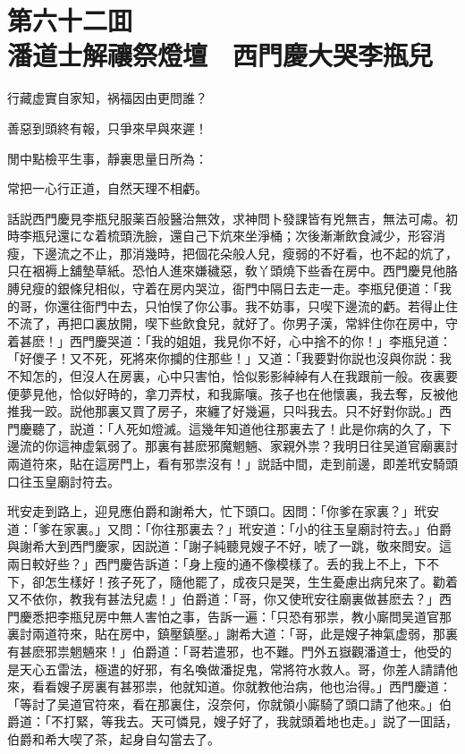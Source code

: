 
\chapter*{第六十二囬　\\潘道士解禳祭燈壇　西門慶大哭李瓶兒}
\thispagestyle{empty}

\begin{myquote}
行藏虚實自家知，祸福因由更問誰？

善惡到頭終有報，只爭來早與來遲！

閒中點檢平生事，靜裏思量日所為：

常把一心行正道，自然天理不相虧。
\end{myquote}

話説西門慶見李瓶兒服薬百般醫治無效，求神問卜發課皆有兇無吉，無法可䖏。初時李瓶兒還にな着梳頭洗臉，還自己下炕來坐淨桶；次後漸漸飲食減少，形容消瘦，下邊流之不止，那消幾時，把個花朵般人兒，瘦弱的不好看，也不起的炕了，只在裀褥上舖墊草紙。恐怕人進來嫌穢惡，敎丫頭燒下些香在房中。西門慶見他胳膊兒瘦的銀條兒相似，守着在房内哭泣，衙門中隔日去走一走。李瓶兒便道：「我的哥，你還往衙門中去，只怕悮了你公事。我不妨事，只喫下邊流的虧。若得止住不流了，再把口裏放開，喫下些飲食兒，就好了。你男子漢，常絆住你在房中，守着甚麽！」西門慶哭道：「我的姐姐，我見你不好，心中捨不的你！」李瓶兒道：「好儍子！又不死，死將來你攔的住那些！」又道：「我要對你説也沒與你説：我不知怎的，但沒人在房裏，心中只害怕，恰似影影綽綽有人在我跟前一般。夜裏要便夢見他，恰似好時的，拿刀弄杖，和我廝嚷。孩子也在他懷裏，我去奪，反被他推我一跤。説他那裏又買了房子，來纏了好幾遍，只呌我去。只不好對你説。」西門慶聽了，説道：「人死如燈滅。這幾年知道他往那裏去了！此是你病的久了，下邊流的你這神虚氣弱了。那裏有甚麽邪魔魍魎、家親外祟？我明日往吴道官廟裏討兩道符來，貼在這房門上，看有邪祟沒有！」説話中間，走到前邊，即差玳安騎頭口往玉皇廟討符去。

玳安走到路上，迎見應伯爵和謝希大，忙下頭口。因問：「你爹在家裏？」玳安道：「爹在家裏。」又問：「你往那裏去？」玳安道：「小的往玉皇廟討符去。」伯爵與謝希大到西門慶家，因説道：「謝子純聽見嫂子不好，唬了一跳，敬來問安。這兩日較好些？」西門慶告訴道：「身上瘦的通不像模樣了。丢的我上不上，下不下，卻怎生樣好！孩子死了，隨他罷了，成夜只是哭，生生憂慮出病兒來了。勸着又不依你，教我有甚法兒處！」伯爵道：「哥，你又使玳安往廟裏做甚麽去？」西門慶悉把李瓶兒房中無人害怕之事，告訴一遍：「只恐有邪祟，教小廝問吴道官那裏討兩道符來，貼在房中，鎮壓鎮壓。」謝希大道：「哥，此是嫂子神氣虚弱，那裏有甚麽邪祟魍魎來！」伯爵道：「哥若遣邪，也不難。門外五嶽觀潘道士，他受的是天心五雷法，極遣的好邪，有名喚做潘捉鬼，常將符水救人。哥，你差人請請他來，看看嫂子房裏有甚邪祟，他就知道。你就教他治病，他也治得。」西門慶道：「等討了吴道官符來，看在那裏住，沒奈何，你就領小廝騎了頭口請了他來。」伯爵道：「不打緊，等我去。天可憐見，嫂子好了，我就頭着地也走。」説了一囬話，伯爵和希大喫了茶，起身自勾當去了。

